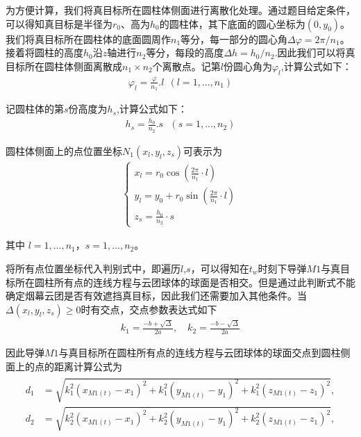 \documentclass[../main.tex]{subfiles}
\begin{document}
\par 为方便计算，我们将真目标所在圆柱体侧面进行离散化处理。通过题目给定条件，可以得知真目标是半径为$r_0$、高为$h_0$的圆柱体，其下底面的圆心坐标为$\left( 0,y_0 \right)$。我们将真目标所在圆柱体的底面圆周作$n_1$等分，每一部分的圆心角$\varDelta \varphi =2\pi /n_1$。接着将圆柱的高度$h_0$沿$z$轴进行$n_2$等分，每段的高度$\varDelta h=h_0/n_2$.因此我们可以将真目标所在圆柱体侧面离散成$n_1\times n_2$个离散点。记第$l$份圆心角为$\varphi _l$,计算公式如下：
\begin{align}\label{1.13}
	\varphi _l=\frac{\varphi}{n_1}.l\ \ \left( l=1,...,n_1 \right) 
\end{align}
\par 记圆柱体的第$s$份高度为$h_s$,计算公式如下：
\begin{align}\label{1.14}
	h_s=\frac{h_0}{n_2}.s\,\,\,\,\left( s=1,...,n_2 \right) 
\end{align}
\par 圆柱体侧面上的点位置坐标$N_1\left( x_l,y_l,z_s \right) $可表示为
\begin{align}
	\begin{cases}\label{1.15}
x_l = r_0 \cos\left( \frac{2\pi}{n_1} \cdot l \right) \\
y_l = y_0 + r_0 \sin\left( \frac{2\pi}{n_1} \cdot l \right) \\
z_s = \frac{h_0}{n_2} \cdot s
\end{cases}
\end{align}	
\par 其中 \( l = 1, \dots, n_1 \)，\( s = 1, \dots, n_2 \)。
\par 将所有点位置坐标代入判别式中，即遍历$l$,$s$，可以得知在$t_w$时刻下导弹$M1$与真目标所在圆柱所有点的连线方程与云团球体的球面是否相交。但是通过此判断式不能确定烟幕云团是否有效遮挡真目标，因此我们还需要加入其他条件。当$\Delta \left( x_l,y_l,z_s \right) \ge 0$时有交点，交点参数表达式如下
\begin{align}\label{1.16}
k_1 = \frac{-b + \sqrt{\Delta}}{2a}, \quad k_2 = \frac{-b - \sqrt{\Delta}}{2a}
\end{align}
\par 因此导弹$M1$与真目标所在圆柱所有点的连线方程与云团球体的球面交点到圆柱侧面上的点的距离计算公式为
\begin{align}\label{1.17}
	\begin{aligned}
d_1 &= \sqrt{k_1^2(x_{M1(t)} - x_1)^2 + k_1^2(y_{M1(t)} - y_1)^2 + k_1^2(z_{M1(t)} - z_1)^2}, \\
d_2 &= \sqrt{k_2^2(x_{M1(t)} - x_1)^2 + k_2^2(y_{M1(t)} - y_1)^2 + k_2^2(z_{M1(t)} - z_1)^2},
\end{aligned}
\end{align}
\end{document}
